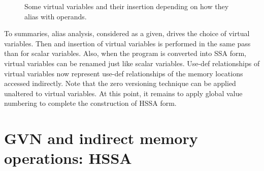\begin{figure}
\caption{\label{fig:hssa:virtual_vars}Some virtual variables and their insertion depending on how they alias with operands.}
\end{figure}

To summaries, alias analysis, considered as a given, drives the choice of virtual variables. 
Then \mufun and \chifun insertion of virtual variables is performed in the same pass than for scalar variables.
Also, when the program is converted into SSA form, virtual variables can be renamed just like scalar variables.
Use-def relationships of virtual variables now represent use-def relationships of the memory locations accessed indirectly.
Note that the zero versioning technique can be applied unaltered to virtual variables.
At this point, it remains to apply global value numbering to complete the construction of HSSA form.

\section{GVN and indirect memory operations: HSSA}

